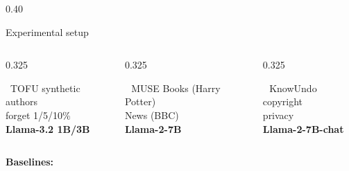      \begin{columns}[T]
        \begin{column}{0.40\linewidth}
          \begin{psublock}[equal height group=r3]{Experimental setup}
            \begin{columns}[T]
              \begin{column}{0.325\linewidth}
                \begin{benchtile}{\ TOFU\autocite{maini2024tofu}}
                  \small synthetic authors\\
                  forget 1/5/10\%\\[0.4ex]
                  \textbf{Llama-3.2 1B/3B}
                \end{benchtile}
              \end{column}
              \begin{column}{0.325\linewidth}
                \begin{benchtile}{\faBook\,\faNewspaper\ MUSE\autocite{shi2025muse}}
                  \small Books (Harry Potter)\\
                  News (BBC)\\[0.4ex]
                  \textbf{Llama-2-7B}
                \end{benchtile}
              \end{column}
              \begin{column}{0.325\linewidth}
                \begin{benchtile}{\faCopyright\,\ KnowUndo\autocite{tian2024knowundo}}
                  \small copyright\\
                  privacy\\[0.4ex]
                  \textbf{Llama-2-7B-chat}
                \end{benchtile}
              \end{column}
            \end{columns}
            \vspace{1ex}
            \textbf{Baselines:}
                  \\[0.8ex]

\end{psublock}
\end{column}
\end{columns}

